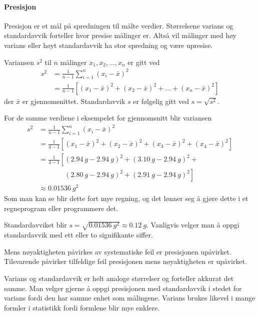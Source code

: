 	\paragraph{Presisjon}
	Presisjon er et mål på spredningen til målte verdier. Størrelsene varians og standardavvik forteller hvor presise målinger er. Altså vil målinger med høy varians eller høyt standardavvik ha stor spredning og være upresise.
	
	Variansen $s^2$ til $n$ målinger $x_1, x_2, \ldots, x_n$ er gitt ved
	\begin{align*}
		s^2 &= \frac{1}{n-1}\sum_{i=1}^{n}(x_i - \bar{x})^2 \\
		&=\frac{1}{n-1}\left[(x_1-\bar{x})^2 + (x_2-\bar{x})^2 + \dots + (x_n-\bar{x})^2\right]
	\end{align*}
	der $\bar{x}$ er gjennomsnittet. Standardavvik $s$ er følgelig gitt ved $s=\sqrt{s^2}$.

	For de samme verdiene i eksempelet for gjennomsnitt blir variansen
	\begin{align*}
		s^2 &= \frac{1}{n-1}\sum_{i=1}^{n}(x_i - \bar{x})^2 \\
		&=\frac{1}{4-1}\left[(x_1-\bar{x})^2 + (x_2-\bar{x})^2 + (x_3-\bar{x})^2 + (x_4-\bar{x})^2\right]\\
		&=\frac{1}{4-1}\left[(\SI{2.94}{g}-\SI{2.94}{g})^2 + ( \SI{3.10}{g}-\SI{2.94}{g})^2\right. + \\
		&\phantom{=\frac{1}{4-1}\left[\right.}\left.  (\SI{2.80}{g}-\SI{2.94}{g})^2 + (\SI{2.91}{g}-\SI{2.94}{g})^2\right]\\
		&\approx \SI{0.01536}{g^2}
	\end{align*}
	Som man kan se blir dette fort mye regning, og det lønner seg å gjøre dette i et regneprogram eller programmere det.
	
	Standardavviket blir $s=\sqrt{\SI{0.01536}{g^2}}\approx\SI{0.12}{g}$. Vanligvis velger man å oppgi standardavvik med ett eller to signifikante siffer. 
	
	Mens nøyaktigheten påvirkes av systematiske feil er presisjonen upåvirket. Tilsvarende påvirker tilfeldige feil presisjonen mens nøyaktigheten er upåvirket.
	
	Varians og standardavvik er helt analoge størrelser og forteller akkurat det samme. Man velger gjerne å oppgi presisjonen med standardavvik i stedet for varians fordi den har samme enhet som målingene. Varians brukes likevel i mange formler i statistikk fordi formlene blir mye enklere.
	
